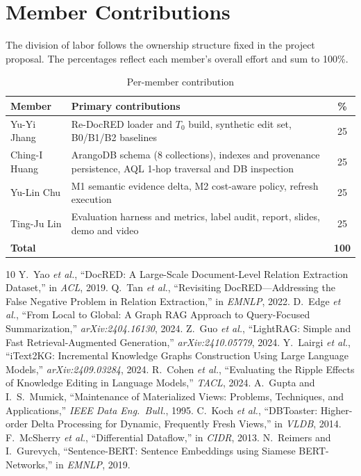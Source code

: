 \documentclass[conference]{IEEEtran}
\begin{document}
\section{Member Contributions}
The division of labor follows the ownership structure fixed in the project
proposal. The percentages reflect each member's overall effort and sum to
100\%.
\begin{table}[h]
\caption{Per-member contribution}
\label{tab:contrib}
\centering
\footnotesize
\setlength{\tabcolsep}{4pt}
\begin{tabular}{p{}p{}c}
\toprule
\textbf{Member} & \textbf{Primary contributions} & \textbf{\%}\\
\midrule
Yu-Yi Jhang & Re-DocRED loader and $T_0$ build, synthetic edit set, B0/B1/B2 baselines & 25\\
Ching-I Huang & ArangoDB schema (8 collections), indexes and provenance persistence, AQL 1-hop traversal and DB inspection & 25\\
Yu-Lin Chu & M1 semantic evidence delta, M2 cost-aware policy, refresh execution & 25\\
Ting-Ju Lin & Evaluation harness and metrics, label audit, report, slides, demo and video & 25\\
\midrule
\textbf{Total} & & \textbf{100}\\
\bottomrule
\end{tabular}
\end{table}

\begin{thebibliography}{10}
\footnotesize
{} Y.~Yao \emph{et al.}, ``DocRED: A Large-Scale Document-Level
Relation Extraction Dataset,'' in \emph{ACL}, 2019.
 Q.~Tan \emph{et al.}, ``Revisiting DocRED---Addressing the
False Negative Problem in Relation Extraction,'' in \emph{EMNLP}, 2022.
 D.~Edge \emph{et al.}, ``From Local to Global: A Graph RAG
Approach to Query-Focused Summarization,'' \emph{arXiv:2404.16130}, 2024.
 Z.~Guo \emph{et al.}, ``LightRAG: Simple and Fast
Retrieval-Augmented Generation,'' \emph{arXiv:2410.05779}, 2024.
 Y.~Lairgi \emph{et al.}, ``iText2KG: Incremental Knowledge
Graphs Construction Using Large Language Models,'' \emph{arXiv:2409.03284}, 2024.
 R.~Cohen \emph{et al.}, ``Evaluating the Ripple Effects of
Knowledge Editing in Language Models,'' \emph{TACL}, 2024.
 A.~Gupta and I.~S.~Mumick, ``Maintenance of Materialized
Views: Problems, Techniques, and Applications,'' \emph{IEEE Data Eng.\ Bull.}, 1995.
 C.~Koch \emph{et al.}, ``DBToaster: Higher-order Delta
Processing for Dynamic, Frequently Fresh Views,'' in \emph{VLDB}, 2014.
 F.~McSherry \emph{et al.}, ``Differential Dataflow,'' in
\emph{CIDR}, 2013.
 N.~Reimers and I.~Gurevych, ``Sentence-BERT: Sentence Embeddings
using Siamese BERT-Networks,'' in \emph{EMNLP}, 2019.
\end{thebibliography}
\end{document}
